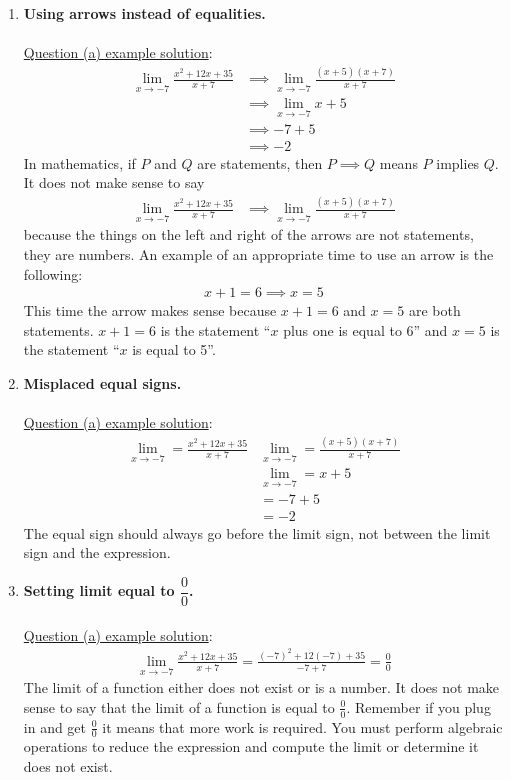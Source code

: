 \documentclass[reqno,psamsfonts]{amsart}
\theoremstyle{definition}
\theoremstyle{remark}
\numberwithin{equation}{section}
\begin{document}
\begin{enumerate}
\item \textbf{Using arrows instead of equalities.}
\\
\\\underline{Question (a) example solution}:
\begin{align*}
\lim\limits_{x\to -7}\frac{x^2+12x+35}{x+7}&\implies \lim\limits_{x\to-7}\frac{(x+5)(x+7)}{x+7}\\
&\implies \lim\limits_{x\to -7}x+5\\
&\implies -7+5\\
&\implies -2
\end{align*}
In mathematics, if $P$ and $Q$ are statements, then $P\implies Q$ means $P$ implies $Q$. It does not make sense to say
\begin{align*}
\lim\limits_{x\to -7}\frac{x^2+12x+35}{x+7}&\implies \lim\limits_{x\to-7}\frac{(x+5)(x+7)}{x+7}
\end{align*}
 because the things on the left and right of the arrows are not statements, they are numbers. An example of an appropriate time to use an arrow is the following:
\begin{align*}
 x+1=6\implies x=5
\end{align*}
This time the arrow makes sense because $x+1=6$ and $x=5$ are both statements. $x+1=6$ is the statement ``$x$ plus one is equal to 6'' and $x=5$ is the statement ``$x$ is equal to 5''.
\\
\item \textbf{Misplaced equal signs.}
\\
\\\underline{Question (a) example solution}:
\begin{align*}
\lim\limits_{x\to -7}=\frac{x^2+12x+35}{x+7}&\lim\limits_{x\to-7}=\frac{(x+5)(x+7)}{x+7}\\
&\lim\limits_{x\to -7}=x+5\\
&=-7+5\\
&= -2
\end{align*}
The equal sign should always go before the limit sign, not between the limit sign and the expression.
\\
\item \textbf{Setting limit equal to $\dfrac{0}{0}$.}
\\
\\\underline{Question (a) example solution}:
\begin{align*}
\lim\limits_{x\to -7}\frac{x^2+12x+35}{x+7}=\frac{(-7)^2+12(-7)+35}{-7+7}=\frac{0}{0}
\end{align*}
The limit of a function either does not exist or is a number. It does not make sense to say that the limit of a function is equal to $\frac{0}{0}$. Remember if you plug in and get $\frac{0}{0}$ it means that more work is required. You must perform algebraic operations to reduce the expression and compute the limit or determine it does not exist.

\end{enumerate}
\end{document}
